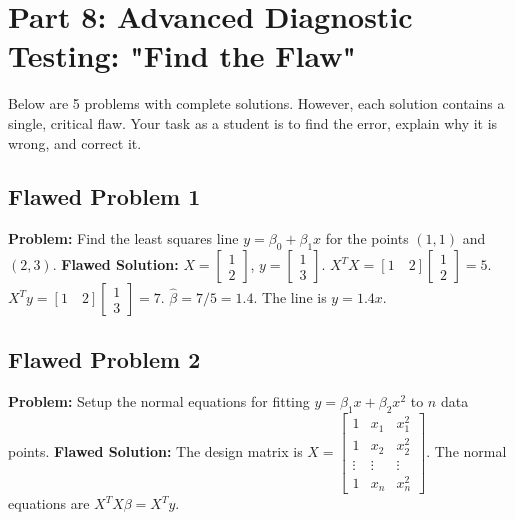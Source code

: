 \documentclass[11pt, letterpaper]{article}
\theoremstyle{definition}
\theoremstyle{remark}
\begin{document}
\newpage
\section{Part 8: Advanced Diagnostic Testing: "Find the Flaw"}

Below are 5 problems with complete solutions. However, each solution contains a single, critical flaw. Your task as a student is to find the error, explain why it is wrong, and correct it.

\subsection*{Flawed Problem 1}
\textbf{Problem:} Find the least squares line $y = \beta_0 + \beta_1 x$ for the points $(1,1)$ and $(2,3)$.
\textbf{Flawed Solution:}
$X = \begin{bmatrix} 1 \\ 2 \end{bmatrix}$, $y = \begin{bmatrix} 1 \\ 3 \end{bmatrix}$.
$X^T X = [1 \quad 2] \begin{bmatrix} 1 \\ 2 \end{bmatrix} = 5$.
$X^T y = [1 \quad 2] \begin{bmatrix} 1 \\ 3 \end{bmatrix} = 7$.
$\hat{\beta} = 7/5 = 1.4$. The line is $y = 1.4x$.
\vspace{1cm}

\subsection*{Flawed Problem 2}
\textbf{Problem:} Setup the normal equations for fitting $y = \beta_1 x + \beta_2 x^2$ to $n$ data points.
\textbf{Flawed Solution:}
The design matrix is $X = \begin{bmatrix} 1 & x_1 & x_1^2 \\ 1 & x_2 & x_2^2 \\ \vdots & \vdots & \vdots \\ 1 & x_n & x_n^2 \end{bmatrix}$. The normal equations are $X^T X \beta = X^T y$.
\vspace{1cm}
\end{document}
